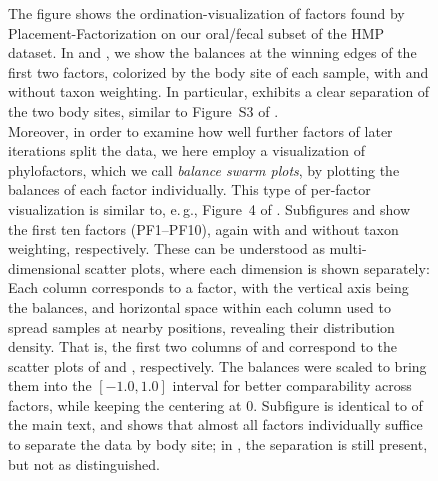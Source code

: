 \begin{figure}[!htb]
{        The figure shows the ordination-visualization of factors found by Placement-Factorization
        on our oral/fecal subset of the \ac{HMP} dataset.
        In 
        and ,
        we show the balances at the winning edges of the first two factors, colorized by the body site of each sample,
        with and without taxon weighting.
        In particular, 
        exhibits a clear separation of the two body sites, similar to Figure~S3 of \cite{Washburne2017a}.
        \\
        Moreover, in order to examine how well further factors of later iterations split the data,
        we here employ a visualization of phylofactors, which we call \emph{balance swarm plots},
        by plotting the balances of each factor individually.
        This type of per-factor visualization is similar to, e.\,g., Figure~4 of \cite{Washburne2019}.
        Subfigures  and
         show the first ten factors
        (PF1--PF10), again with and without taxon weighting, respectively.
        These can be understood as multi-dimensional scatter plots, where each dimension is shown separately:
        Each column corresponds to a factor, with the vertical axis being the balances,
        and horizontal space within each column used to spread samples at nearby positions,
        revealing their distribution density.
        That is, the first two columns of
         and
        correspond to the scatter plots of
        and , respectively.
        The balances were scaled to bring them into the $[ -1.0, 1.0 ]$ interval for better comparability across factors,
        while keeping the centering at \num{0}.
        Subfigure 
        is identical to  of the main text, and shows
        that almost all factors individually suffice to separate the data by body site;
        in ,
        the separation is still present, but not as distinguished.
    }
    \label{fig:hmp_pf_of_600_factor_ordination}
\end{figure}

